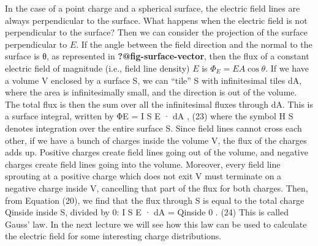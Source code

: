 \documentclass[
  letterpaper,
  DIV=11,
  numbers=noendperiod]{scrreprt}
\begin{document}
In the case of a point charge and a spherical surface, the electric
field lines are always perpendicular to the surface. What happens when
the electric field is not perpendicular to the surface? Then we can
consider the projection of the surface perpendicular to \(E\). If the
angle between the field direction and the normal to the surface is θ, as
represented in \textbf{?@fig-surface-vector}, then the flux of a
constant electric field of magnitude (i.e., field line density) \(E\) is
\(\Phi_E = EA \cos\theta\). If we have a volume V enclosed by a surface
S, we can ``tile'' S with infinitesimal tiles dA, where the area is
infinitesimally small, and the direction is out of the volume. The total
flux is then the sum over all the infinitesimal fluxes through dA. This
is a surface integral, written by ΦE = I S E · dA , (23) where the
symbol H S denotes integration over the entire surface S. Since field
lines cannot cross each other, if we have a bunch of charges inside the
volume V, the flux of the charges adds up. Positive charges create field
lines going out of the volume, and negative charges create field lines
going into the volume. Moreover, every field line sprouting at a
positive charge which does not exit V must terminate on a negative
charge inside V, cancelling that part of the flux for both charges.
Then, from Equation (20), we find that the flux through S is equal to
the total charge Qinside inside S, divided by 0: I S E · dA = Qinside 0
. (24) This is called Gauss' law. In the next lecture we will see how
this law can be used to calculate the electric field for some
interesting charge distributions.
\end{document}
